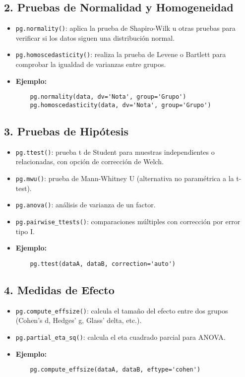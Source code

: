 \documentclass[12pt,a4paper]{article}
\begin{document}
\subsection{2. Pruebas de Normalidad y Homogeneidad}
\begin{itemize}
    \item \texttt{pg.normality()}: aplica la prueba de Shapiro-Wilk u otras pruebas para verificar si los datos siguen una distribución normal.
    \item \texttt{pg.homoscedasticity()}: realiza la prueba de Levene o Bartlett para comprobar la igualdad de varianzas entre grupos.
    \item \textbf{Ejemplo:}
    \begin{verbatim}
    pg.normality(data, dv='Nota', group='Grupo')
    pg.homoscedasticity(data, dv='Nota', group='Grupo')
    \end{verbatim}
\end{itemize}

\subsection{3. Pruebas de Hipótesis}
\begin{itemize}
    \item \texttt{pg.ttest()}: prueba t de Student para muestras independientes o relacionadas, con opción de corrección de Welch.
    \item \texttt{pg.mwu()}: prueba de Mann-Whitney U (alternativa no paramétrica a la t-test).
    \item \texttt{pg.anova()}: análisis de varianza de un factor.
    \item \texttt{pg.pairwise\_ttests()}: comparaciones múltiples con corrección por error tipo I.
    \item \textbf{Ejemplo:}
    \begin{verbatim}
    pg.ttest(dataA, dataB, correction='auto')
    \end{verbatim}
\end{itemize}

\subsection{4. Medidas de Efecto}
\begin{itemize}
    \item \texttt{pg.compute\_effsize()}: calcula el tamaño del efecto entre dos grupos (Cohen’s d, Hedges’ g, Glass’ delta, etc.).
    \item \texttt{pg.partial\_eta\_sq()}: calcula el eta cuadrado parcial para ANOVA.
    \item \textbf{Ejemplo:}
    \begin{verbatim}
    pg.compute_effsize(dataA, dataB, eftype='cohen')
    \end{verbatim}
\end{itemize}
\end{document}
